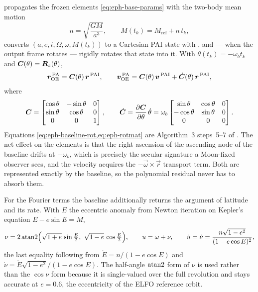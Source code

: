  propagates the frozen elements
\cref{eq:eph-base-params} with the two-body mean motion
\begin{equation}
  \label{eq:eph-mean-motion}
  n = \sqrt{\frac{GM}{a^3}},
  \qquad
  M(t_k) = M_\mathrm{ref} + n\,t_k,
\end{equation}
converts $(a,e,i,\Omega,\omega,M(t_k))$ to a Cartesian PAI state with
, and --- when the output frame rotates --- rigidly
rotates that state into it. With $\theta(t_k) = -\omega_b t_k$ and
$\bm{C}(\theta) = \bm{R}_z(\theta)$,
\begin{equation}
  \label{eq:eph-baseline-rot}
  \bm{r}^{\,\mathrm{PA}}_\mathrm{OE} = \bm{C}(\theta)\,\bm{r}^{\,\mathrm{PAI}},
  \qquad
  \bm{v}^{\,\mathrm{PA}}_\mathrm{OE} = \bm{C}(\theta)\,\bm{v}^{\,\mathrm{PAI}}
    + \dot{\bm{C}}(\theta)\,\bm{r}^{\,\mathrm{PAI}},
\end{equation}
where
\begin{equation}
  \label{eq:eph-rotmat}
  \bm{C} =
  \begin{bmatrix}
    \cos\theta & -\sin\theta & 0 \\
    \sin\theta & \cos\theta & 0 \\
    0 & 0 & 1
  \end{bmatrix},
  \qquad
  \dot{\bm{C}} = \frac{\partial\bm{C}}{\partial\theta}\,\dot\theta
  = \omega_b
  \begin{bmatrix}
    \sin\theta & \cos\theta & 0 \\
    -\cos\theta & \sin\theta & 0 \\
    0 & 0 & 0
  \end{bmatrix}.
\end{equation}
Equations \cref{eq:eph-baseline-rot,eq:eph-rotmat} are Algorithm~3 steps~5--7
of \citep[Ch.~7]{iiyama2026thesis}. The net effect on the elements is that the
right ascension of the ascending node of the baseline drifts at $-\omega_b$,
which is precisely the secular signature a Moon-fixed observer sees, and the
velocity acquires the $-\vec{\omega}\times\vec{r}$ transport term. Both are
represented exactly by the baseline, so the polynomial residual never has to
absorb them.

For the Fourier terms the baseline additionally returns the argument of
latitude and its rate. With $E$ the eccentric anomaly from Newton iteration on
Kepler's equation $E - e\sin E = M$,
\begin{equation}
  \label{eq:eph-arglat}
  \nu = 2\atantwo\!\Big(\sqrt{1+e}\,\sin\tfrac{E}{2},\ \sqrt{1-e}\,\cos\tfrac{E}{2}\Big),
  \qquad
  u = \omega + \nu,
  \qquad
  \dot u = \dot\nu = \frac{n\sqrt{1-e^2}}{(1 - e\cos E)^2},
\end{equation}
the last equality following from $\dot E = n/(1-e\cos E)$ and
$\dot\nu = \dot E\sqrt{1-e^2}/(1-e\cos E)$. The half-angle $\operatorname{atan2}$ form of
$\nu$ is used rather than the $\cos\nu$ form because it is single-valued over
the full revolution and stays accurate at $e = 0.6$, the eccentricity of the
ELFO reference orbit.

